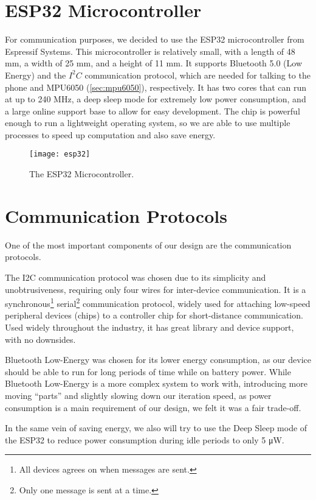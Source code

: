 \section{ESP32 Microcontroller}

For communication purposes, we decided to use the ESP32 microcontroller from
Espressif Systems. This microcontroller is relatively small, with a length of 48
mm, a width of 25 mm, and a height of 11 mm. It supports
Bluetooth 5.0 (Low Energy) and the $I^2C$ communication protocol, which are needed
for talking to the phone and MPU6050 (\autoref{sec:mpu6050}), respectively. It
has two cores that can run at up to 240 MHz, a deep sleep mode for extremely low
power consumption, and a large online support base to allow for easy
development. The chip is powerful enough to run a lightweight operating system,
so we are able to use multiple processes to speed up computation and also save
energy.

\begin{figure}[h]
  \centering
  \texttt{[image: esp32]}
  \caption{The ESP32 Microcontroller.}
\end{figure}

\section{Communication Protocols}

One of the most important components of our design are the communication
protocols.

The I2C communication protocol was chosen due to its simplicity and
unobtrusiveness, requiring only four wires for inter-device communication. It is
a synchronous\footnote{All devices agrees on when messages are sent.}
serial\footnote{Only one message is sent at a time.} communication protocol,
widely used for attaching low-speed peripheral devices (chips) to a controller
chip for short-distance communication. Used widely throughout the industry, it
has great library and device support, with no downsides.

Bluetooth Low-Energy was chosen for its lower energy consumption, as our device
should be able to run for long periods of time while on battery power. While
Bluetooth Low-Energy is a more complex system to work with, introducing more
moving ``parts'' and slightly slowing down our iteration speed, as power
consumption is a main requirement of our design, we felt it was a fair
trade-off.

In the same vein of saving energy, we also will try to use the Deep
Sleep mode of the ESP32 to reduce power consumption during idle periods to only
5 \unit{\uW}. 

